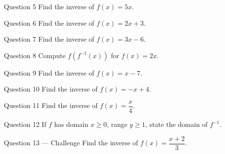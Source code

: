 \documentclass[11pt]{article}
\begin{document}
\begin{qbox}{Question 5}
Find the inverse of $f(x)=5x$.\workspace{2.4cm}
\end{qbox}

\begin{qbox}{Question 6}
Find the inverse of $f(x)=2x+3$.\workspace{2.4cm}
\end{qbox}

\begin{qbox}{Question 7}
Find the inverse of $f(x)=3x-6$.\workspace{2.4cm}
\end{qbox}

\begin{qbox}{Question 8}
Compute $f(f^{-1}(x))$ for $f(x)=2x$.\workspace{2.4cm}
\end{qbox}

\begin{qbox}{Question 9}
Find the inverse of $f(x)=x-7$.\workspace{2.4cm}
\end{qbox}

\begin{qbox}{Question 10}
Find the inverse of $f(x)=-x+4$.\workspace{2.4cm}
\end{qbox}

\begin{qbox}{Question 11}
Find the inverse of $f(x)=\dfrac{x}{4}$.\workspace{2.4cm}
\end{qbox}

\begin{qbox}{Question 12}
If $f$ has domain $x\ge0$, range $y\ge1$, state the domain of $f^{-1}$.\workspace{2.4cm}
\end{qbox}

\begin{qbox}{Question 13 --- Challenge}
Find the inverse of $f(x)=\dfrac{x+2}{3}$.\workspace{2.6cm}
\end{qbox}

\clearpage
{}
\end{document}
